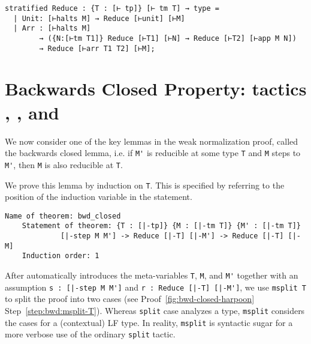 \begin{lstlisting}
stratified Reduce : {T : [⊢ tp]} [⊢ tm T] → type =
  | Unit: [⊢halts M] → Reduce [⊢unit] [⊢M]
  | Arr : [⊢halts M]
        → ({N:[⊢tm T1]} Reduce [⊢T1] [⊢N] → Reduce [⊢T2] [⊢app M N])
        → Reduce [⊢arr T1 T2] [⊢M];
\end{lstlisting}

\section{%
  Backwards Closed Property: tactics \ttmsplit, \ttsuffices, and \ttby%
}

We now consider one of the key lemmas in the weak normalization proof,
called the backwards closed lemma, i.e.  if \lstinline!M'! is
reducible at some type \lstinline!T! and \lstinline!M! steps to
\lstinline!M'!, then \lstinline!M! is also reducible at \lstinline!T!.

We prove this lemma by induction on \lstinline!T!. This is
specified by referring to the position of the induction variable in
the statement.

\begin{lstlisting}[gobble=2, deletekeywords={of}]
    Name of theorem: bwd_closed
    Statement of theorem: {T : [|-tp]} {M : [|-tm T]} {M' : [|-tm T]}
             [|-step M M'] -> Reduce [|-T] [|-M'] -> Reduce [|-T] [|-M]
    Induction order: 1
\end{lstlisting}

%
After \Harpoon{} automatically
introduces the meta-variables \lstinline!T!, \lstinline!M!,
and \lstinline!M'! together with an assumption
\lstinline!s : [|-step M M']! and \lstinline!r : Reduce [|-T] [|-M']!,
we use \lstinline!msplit T! to split the proof into two cases (see
\Harpoon{} Proof~\ref{fig:bwd-closed-harpoon}
Step~\ref{step:bwd:msplit-T}). Whereas \lstinline!split! case analyzes
a \Beluga{} type, \lstinline!msplit! considers the cases for a
(contextual) LF type. In reality, \lstinline!msplit! is syntactic sugar for a
more verbose use of the ordinary \lstinline!split! tactic.


